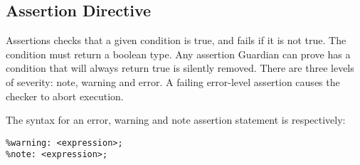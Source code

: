 
\subsection{Assertion Directive}
{
	Assertions checks that a given condition is true, and fails if it is not true.
	The condition must return a boolean type.
	Any assertion Guardian can prove has a condition that will always return
	true is silently removed.
	There are three levels of severity: note, warning and error.
	A failing error-level assertion causes the checker to abort execution.
	
	The syntax for an error, warning and note assertion statement is
	respectively:
	\begin{lstlisting}[texcl = true, language = MAIA]
%error: <expression>;
%warning: <expression>;
%note: <expression>;
	\end{lstlisting}
}
